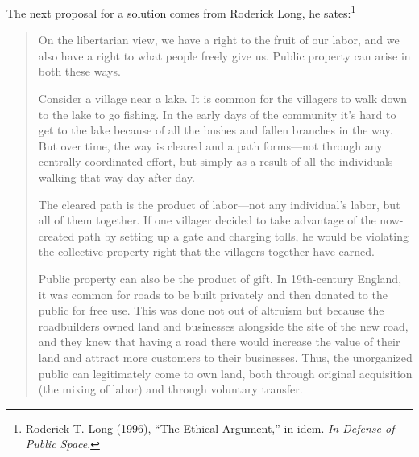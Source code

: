 \documentclass[11pt]{article}
\begin{document}
The next proposal for a solution comes from Roderick Long, he sates:\footnote{Roderick T. Long (1996), “The Ethical Argument,” in idem. \emph{In Defense of Public Space}.}
\begin{quote}
On the libertarian view, we have a right to the fruit of our labor, and we also have a right to what people freely give us. Public property can arise in both these ways.

Consider a village near a lake. It is common for the villagers to walk down to the lake to go fishing. In the early days of the community it’s hard to get to the lake because of all the bushes and fallen branches in the way. But over time, the way is cleared and a path forms---not through any centrally coordinated effort, but simply as a result of all the individuals walking that way day after day.

The cleared path is the product of labor---not any individual’s labor, but all of them together. If one villager decided to take advantage of the now-created path by setting up a gate and charging tolls, he would be violating the collective property right that the villagers together have earned.

Public property can also be the product of gift. In 19th-century England, it was common for roads to be built privately and then donated to the public for free use. This was done not out of altruism but because the roadbuilders owned land and businesses alongside the site of the new road, and they knew that having a road there would increase the value of their land and attract more customers to their businesses. Thus, the unorganized public can legitimately come to own land, both through original acquisition (the mixing of labor) and through voluntary transfer.
\end{quote}
\end{document}
